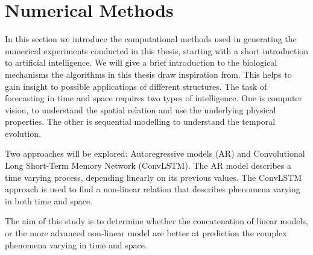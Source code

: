 \setcounter{chapter}{2}
\chapter{Numerical Methods} \label{ch:num_methods}
In this section we introduce the computational methods used in generating the numerical experiments conducted in this thesis, starting with a short introduction to artificial intelligence. We will give a brief introduction to the biological mechanisms the algorithms in this thesis draw inspiration from. This helps to gain insight to possible applications of different structures.
The task of forecasting in time and space requires two types of intelligence. One is computer vision, to understand the spatial relation and use the underlying physical properties. The other is sequential modelling to understand the temporal evolution.

Two approaches will be explored: Autoregressive models (AR) and Convolutional Long Short-Term Memory Network (ConvLSTM). The AR model describes a time varying process, depending linearly on its previous values. The ConvLSTM approach is used to find a non-linear relation that describes phenomena varying in both time and space.

The aim of this study is to determine whether the concatenation of linear models, or the more advanced non-linear model are better at prediction the complex phenomena varying in time and space.

